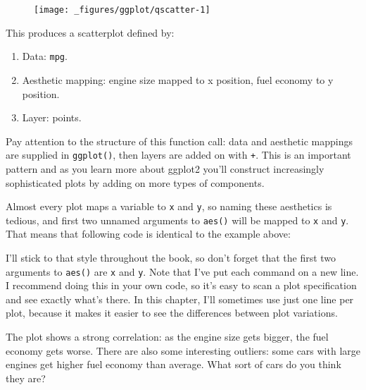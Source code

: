 \begin{figure}[H]
  \centering
  \texttt{[image: \_figures/ggplot/qscatter-1]}
\end{figure}

This produces a scatterplot defined by:

\begin{enumerate}
\def\labelenumi{\arabic{enumi}.}
\itemsep1pt\parskip0pt
\item
  Data: \texttt{mpg}.
\item
  Aesthetic mapping: engine size mapped to x position, fuel economy to y
  position.
\item
  Layer: points.
\end{enumerate}

Pay attention to the structure of this function call: data and aesthetic
mappings are supplied in \texttt{ggplot()}, then layers are added on
with \texttt{+}. This is an important pattern and as you learn more
about ggplot2 you'll construct increasingly sophisticated plots by
adding on more types of components.

Almost every plot maps a variable to \texttt{x} and \texttt{y}, so
naming these aesthetics is tedious, and first two unnamed arguments to
\texttt{aes()} will be mapped to \texttt{x} and \texttt{y}. That means
that following code is identical to the example above:

\begin{Shaded}
\begin{Highlighting}[]
\StringTok{  }\NormalTok{()}
\end{Highlighting}
\end{Shaded}

I'll stick to that style throughout the book, so don't forget that the
first two arguments to \texttt{aes()} are \texttt{x} and \texttt{y}.
Note that I've put each command on a new line. I recommend doing this in
your own code, so it's easy to scan a plot specification and see exactly
what's there. In this chapter, I'll sometimes use just one line per
plot, because it makes it easier to see the differences between plot
variations.

The plot shows a strong correlation: as the engine size gets bigger, the
fuel economy gets worse. There are also some interesting outliers: some
cars with large engines get higher fuel economy than average. What sort
of cars do you think they are?

